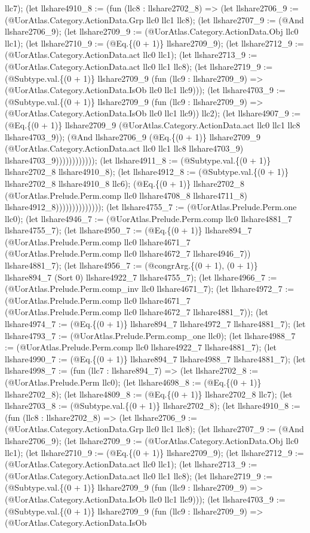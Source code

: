 \documentclass[11pt]{article}
\begin{document}
llc7); (let llshare4910\_8 := (fun (llc8 : llshare2702\_8) => (let llshare2706\_9 := (@UorAtlas.Category.ActionData.Grp llc0 llc1 llc8); (let llshare2707\_9 := (@And llshare2706\_9); (let llshare2709\_9 := (@UorAtlas.Category.ActionData.Obj llc0 llc1); (let llshare2710\_9 := (@Eq.\{(0 + 1)\} llshare2709\_9); (let llshare2712\_9 := (@UorAtlas.Category.ActionData.act llc0 llc1); (let llshare2713\_9 := (@UorAtlas.Category.ActionData.act llc0 llc1 llc8); (let llshare2719\_9 := (@Subtype.val.\{(0 + 1)\} llshare2709\_9 (fun (llc9 : llshare2709\_9) => (@UorAtlas.Category.ActionData.IsOb llc0 llc1 llc9))); (let llshare4703\_9 := (@Subtype.val.\{(0 + 1)\} llshare2709\_9 (fun (llc9 : llshare2709\_9) => (@UorAtlas.Category.ActionData.IsOb llc0 llc1 llc9)) llc2); (let llshare4907\_9 := (@Eq.\{(0 + 1)\} llshare2709\_9 (@UorAtlas.Category.ActionData.act llc0 llc1 llc8 llshare4703\_9)); (@And llshare2706\_9 (@Eq.\{(0 + 1)\} llshare2709\_9 (@UorAtlas.Category.ActionData.act llc0 llc1 llc8 llshare4703\_9) llshare4703\_9)))))))))))); (let llshare4911\_8 := (@Subtype.val.\{(0 + 1)\} llshare2702\_8 llshare4910\_8); (let llshare4912\_8 := (@Subtype.val.\{(0 + 1)\} llshare2702\_8 llshare4910\_8 llc6); (@Eq.\{(0 + 1)\} llshare2702\_8 (@UorAtlas.Prelude.Perm.comp llc0 llshare4708\_8 llshare4711\_8) llshare4912\_8)))))))))))))); (let llshare4755\_7 := (@UorAtlas.Prelude.Perm.one llc0); (let llshare4946\_7 := (@UorAtlas.Prelude.Perm.comp llc0 llshare4881\_7 llshare4755\_7); (let llshare4950\_7 := (@Eq.\{(0 + 1)\} llshare894\_7 (@UorAtlas.Prelude.Perm.comp llc0 llshare4671\_7 (@UorAtlas.Prelude.Perm.comp llc0 llshare4672\_7 llshare4946\_7)) llshare4881\_7); (let llshare4956\_7 := (@congrArg.\{(0 + 1), (0 + 1)\} llshare894\_7 (Sort 0) llshare4922\_7 llshare4755\_7); (let llshare4966\_7 := (@UorAtlas.Prelude.Perm.comp\_inv llc0 llshare4671\_7); (let llshare4972\_7 := (@UorAtlas.Prelude.Perm.comp llc0 llshare4671\_7 (@UorAtlas.Prelude.Perm.comp llc0 llshare4672\_7 llshare4881\_7)); (let llshare4974\_7 := (@Eq.\{(0 + 1)\} llshare894\_7 llshare4972\_7 llshare4881\_7); (let llshare4793\_7 := (@UorAtlas.Prelude.Perm.comp\_one llc0); (let llshare4988\_7 := (@UorAtlas.Prelude.Perm.comp llc0 llshare4922\_7 llshare4881\_7); (let llshare4990\_7 := (@Eq.\{(0 + 1)\} llshare894\_7 llshare4988\_7 llshare4881\_7); (let llshare4998\_7 := (fun (llc7 : llshare894\_7) => (let llshare2702\_8 := (@UorAtlas.Prelude.Perm llc0); (let llshare4698\_8 := (@Eq.\{(0 + 1)\} llshare2702\_8); (let llshare4809\_8 := (@Eq.\{(0 + 1)\} llshare2702\_8 llc7); (let llshare2703\_8 := (@Subtype.val.\{(0 + 1)\} llshare2702\_8); (let llshare4910\_8 := (fun (llc8 : llshare2702\_8) => (let llshare2706\_9 := (@UorAtlas.Category.ActionData.Grp llc0 llc1 llc8); (let llshare2707\_9 := (@And llshare2706\_9); (let llshare2709\_9 := (@UorAtlas.Category.ActionData.Obj llc0 llc1); (let llshare2710\_9 := (@Eq.\{(0 + 1)\} llshare2709\_9); (let llshare2712\_9 := (@UorAtlas.Category.ActionData.act llc0 llc1); (let llshare2713\_9 := (@UorAtlas.Category.ActionData.act llc0 llc1 llc8); (let llshare2719\_9 := (@Subtype.val.\{(0 + 1)\} llshare2709\_9 (fun (llc9 : llshare2709\_9) => (@UorAtlas.Category.ActionData.IsOb llc0 llc1 llc9))); (let llshare4703\_9 := (@Subtype.val.\{(0 + 1)\} llshare2709\_9 (fun (llc9 : llshare2709\_9) => (@UorAtlas.Category.ActionData.IsOb 
\end{document}
